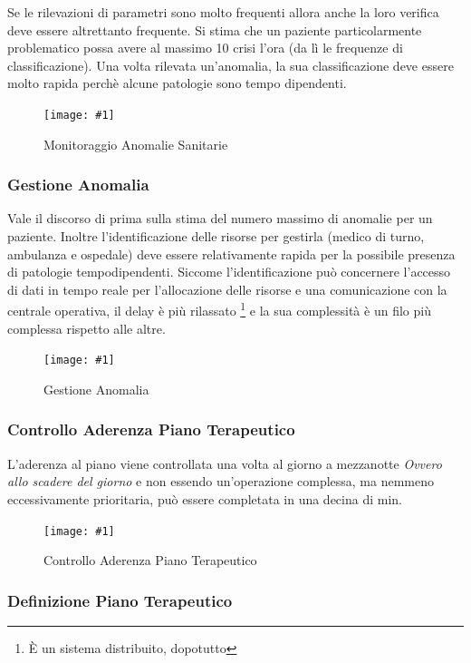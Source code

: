 \documentclass[a4paper,11pt,oneside, table]{article}
\newcommand{\putimage}[4] {
	\begin{figure}[H]
	    \centering
	    \texttt{[image: \#1]}
	    \caption{#2}\label{#3}
	\end{figure}
}
\begin{document}
Se le rilevazioni di parametri sono molto frequenti allora anche la loro verifica deve essere altrettanto frequente.
Si stima che un paziente particolarmente problematico possa avere al massimo 10 crisi l'ora (da l\`i le frequenze di classificazione).
Una volta rilevata un'anomalia, la sua classificazione deve essere molto rapida perch\`e alcune patologie sono tempo dipendenti.

\putimage{images/Diagramma delle Attivita'/Monitoraggio Anomalie Sanitarie.png}{Monitoraggio Anomalie Sanitarie}{png:act:monitoraggio-anomalie-sanitarie}{1}

\subsubsection{Gestione Anomalia}

Vale il discorso di prima sulla stima del numero massimo di anomalie per un paziente. Inoltre l'identificazione delle risorse per gestirla (medico di turno, ambulanza e ospedale) deve essere relativamente rapida per la possibile presenza di patologie tempodipendenti. Siccome l'identificazione pu\`o concernere l'accesso di dati in tempo reale per l'allocazione delle risorse e una comunicazione con la centrale operativa, il delay \`e pi\`u rilassato \footnote{\`E un sistema distribuito, dopotutto} e la sua complessit\`a \`e un filo pi\`u complessa rispetto alle altre.

\putimage{images/Diagramma delle Attivita'/Gestione Anomalia.png}{Gestione Anomalia}{png:act:gestione-anomalia}{1}

\subsubsection{Controllo Aderenza Piano Terapeutico}

L'aderenza al piano viene controllata una volta al giorno a mezzanotte \textit{Ovvero allo scadere del giorno} e non essendo un'operazione complessa, ma nemmeno eccessivamente prioritaria, pu\`o essere completata in una decina di min.

\putimage{images/Diagramma delle Attivita'/Controllo Aderenza Piano Terapeutico.png}{Controllo Aderenza Piano Terapeutico}{png:act:controllo-aderenza-piano-terapeutico}{1}

\subsubsection{Definizione Piano Terapeutico}
\end{document}
